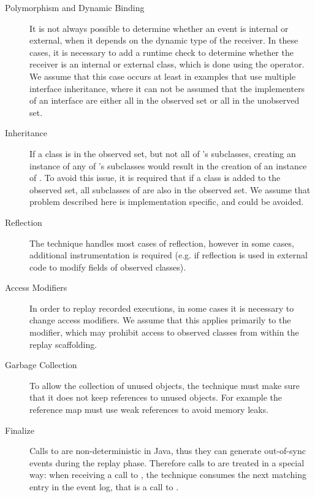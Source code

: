 \begin{description}
 \item [Polymorphism and Dynamic Binding] It is not always possible to determine whether an event is internal or external, when it depends on the dynamic type of the receiver. In these cases, it is necessary to add a runtime check to determine whether the receiver is an internal or external class, which is done using the  operator. We assume that this case occurs at least in examples that use multiple interface inheritance, where it can not be assumed that the implementers of an interface are either all in the observed set or all in the unobserved set.
 \item [Inheritance] If a class  is in the observed set, but not all of 's subclasses, creating an instance of any of 's subclasses would result in the creation of an instance of . To avoid this issue, it is required that if a class  is added to the observed set, all subclasses of  are also in the observed set. We assume that problem described here is implementation specific, and could be avoided.
 \item [Reflection] The technique handles most cases of reflection, however in some cases, additional instrumentation is required (e.g. if reflection is used in external code to modify fields of observed classes). 
 \item [Access Modifiers] In order to replay recorded executions, in some cases it is necessary to change access modifiers. We assume that this applies primarily to the  modifier, which may prohibit access to observed classes from within the replay scaffolding.
 \item [Garbage Collection] To allow the collection of unused objects, the technique must make sure that it does not keep references to unused objects. For example the reference map must use weak references to avoid memory leaks.
 \item [Finalize] Calls to  are non-deterministic in Java, thus they can generate out-of-sync events during the replay phase. Therefore calls to  are treated in a special way: when receiving a call to , the technique consumes the next matching entry in the event log, that is a call to .
\end{description}
